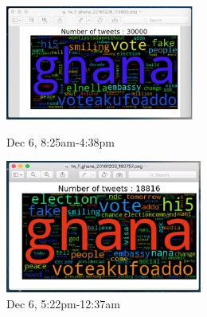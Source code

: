 \documentclass[12pt,notitlepage]{article}
\begin{document}
\begin{figure}[htb]
	\centering
	\begin{minipage}[b]{0.43\textwidth}
		\includegraphics[width=\textwidth]{WordCloudAnalystGana_1.pdf}
		\caption{Dec 6, 8:25am-4:38pm}
		\label{fig:WordCloudAnalystGana_1}
	\end{minipage}
	\begin{minipage}[b]{0.4\textwidth}
		\includegraphics[width=\textwidth]{WordCloudAnalystGana_2.pdf}
		\caption{Dec 6, 5:22pm-12:37am}
		\label{fig:WordCloudAnalystGana_2}
	\end{minipage}
\end{figure}
\end{document}
